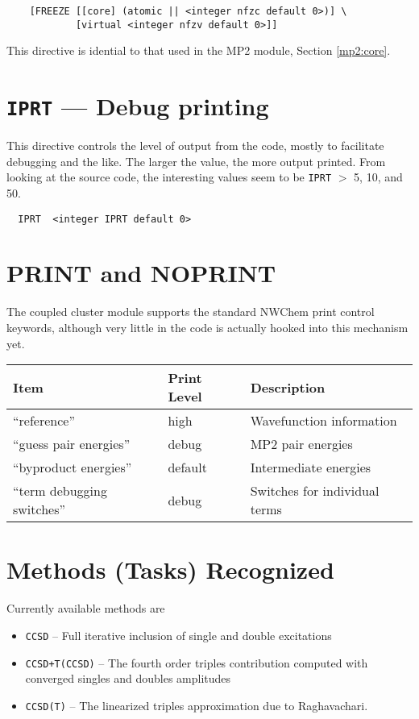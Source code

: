\begin{verbatim}
    [FREEZE [[core] (atomic || <integer nfzc default 0>)] \
            [virtual <integer nfzv default 0>]]
\end{verbatim}

This directive is idential to that used in the MP2 module, Section
\ref{mp2:core}.

\section{{\tt IPRT} --- Debug printing}

This directive controls the level of output from the code, mostly to
facilitate debugging and the like.  The larger the value, the more
output printed.  From looking at the source code, the interesting
values seem to be \verb+IPRT+ $>$ 5, 10, and 50.

\begin{verbatim}
  IPRT  <integer IPRT default 0>
\end{verbatim}

\section{PRINT and NOPRINT}

The coupled cluster module supports the standard NWChem print control
keywords, although very little in the code is actually hooked into
this mechanism yet.

\begin{tabular}{lll}
\hline\hline
Item                    & Print Level   & Description \\
\hline
``reference''             & high          & Wavefunction information\\
``guess pair energies'' & debug & MP2 pair energies\\
``byproduct energies'' & default & Intermediate energies   \\
``term debugging switches'' & debug & Switches for individual terms \\
\hline\hline
\end{tabular}


\section{Methods (Tasks) Recognized}

Currently available methods are
\begin{itemize}
\item \verb+CCSD+ -- Full iterative inclusion of single and double
excitations
\item \verb=CCSD+T(CCSD)= -- The fourth order triples contribution computed with
converged singles and doubles amplitudes
\item \verb=CCSD(T)= -- The linearized triples approximation due to
  Raghavachari.
\end{itemize}

